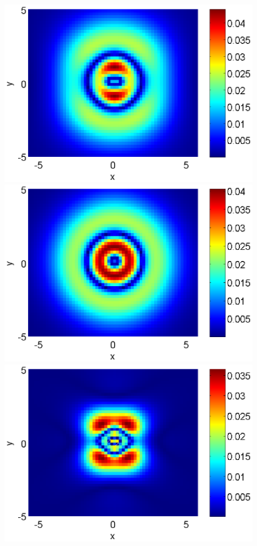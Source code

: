 \documentclass[leqno,11pt]{book}
\begin{document}
\begin{figure}[htbp]
	\begin{minipage}[b]{0.48\linewidth}
		\raggedleft
		\includegraphics[width=\linewidth]{differences/difference_c=03_beta=1.eps}
	\end{minipage}
	\begin{minipage}[b]{0.48\linewidth}
		 \raggedright
		\includegraphics[width=\linewidth]{differences/difference_c=01_beta=1.eps}
	\end{minipage}
	\begin{minipage}[b]{0.48\linewidth}
		\raggedleft
		 \includegraphics[width=\linewidth]{differences/difference_c=03_beta=3.eps}

\end{minipage}
\end{figure}
\end{document}
